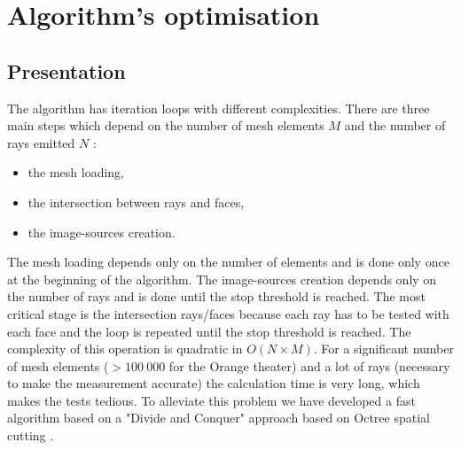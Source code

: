 \documentclass[AMA,STIX1COL]{WileyNJD-v2}
\begin{document}

\section{Algorithm's optimisation}\label{sec4}
\subsection{Presentation}

The algorithm has iteration loops with different complexities. There are three main steps which depend on the number of mesh elements $M$ and the number of rays emitted $N$ :\begin{itemize}
\item the mesh loading,
\item the intersection between rays and faces,
\item the image-sources creation.
\end{itemize}

The mesh loading depends only on the number of elements and is done only once at the beginning of the algorithm. The image-sources creation depends only on the number of rays and is done until the stop threshold is reached. The most critical stage is the intersection rays/faces because each ray has to be tested with each face and the loop is repeated until the stop threshold is reached. The complexity of this operation is quadratic in $O(N\times M)$. For a significant number of mesh elements ($>100~000$ for the Orange theater) and a lot of rays (necessary to make the measurement accurate) the calculation time is very long, which makes the tests tedious. To alleviate this problem we have developed a fast algorithm based on a "Divide and Conquer" approach based on Octree spatial cutting \cite{greengard}.
\end{document}
